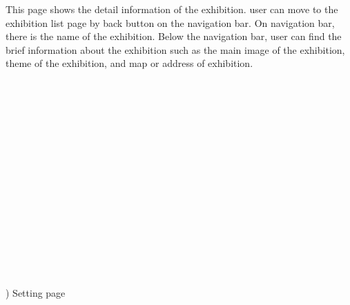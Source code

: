 \documentclass[conference]{IEEEtran}
\begin{document}
This page shows the detail information of the exhibition. user can move to the exhibition list page by back button on the navigation bar. On navigation bar, there is the name of the exhibition. Below the navigation bar, user can find the brief information about the exhibition such as the main image of the exhibition, theme of the exhibition, and map or address of exhibition. \\\\\\\\\\\\\\\\\\\\\\\\\\\\\\\\\\



) Setting page
\end{document}
